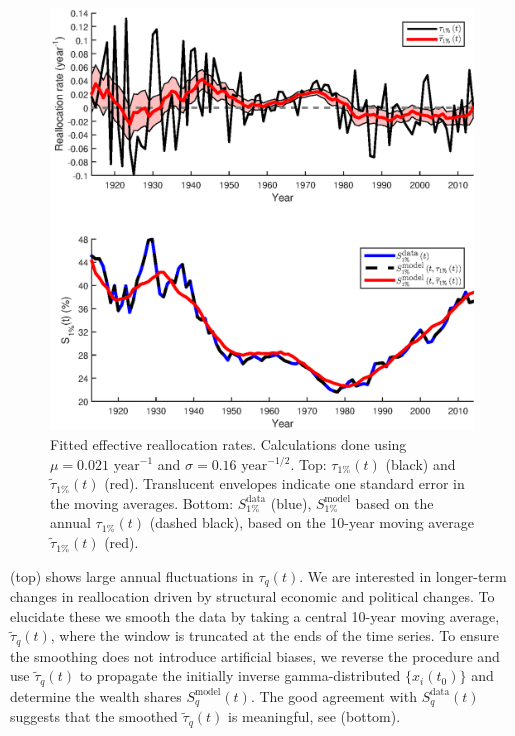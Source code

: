 \begin{figure}[!htb]
\centering
\includegraphics[width=1.0\textwidth] {./chapter_3/figs/tau_top1.eps}
\caption{Fitted effective reallocation rates. Calculations done using $\mu=0.021 \text{ year}^{-1}$ and $\sigma=0.16 \text{ year}^{-1/2}$. Top: $\tau_{1\%}\left(t\right)$ (black) and $\widetilde{\tau}_{1\%}\left(t\right)$ (red). Translucent envelopes indicate one standard error in the moving averages. Bottom: $S^{\text{data}}_{1\%}$ (blue), $S^{\text{model}}_{1\%}$ based on the annual $\tau_{1\%}\left(t\right)$ (dashed black), based on the 10-year moving average $\widetilde{\tau}_{1\%}\left(t\right)$ (red).}
\end{figure}

 (top) shows large annual fluctuations in $\tau_q\left(t\right)$. We are interested in longer-term changes in reallocation driven by structural economic and political changes. To elucidate these we smooth the data by taking a central 10-year moving average, $\widetilde{\tau}_q\left(t\right)$, where the window is truncated at the ends of the time series. To ensure the smoothing does not introduce artificial biases, we reverse the procedure and use $\widetilde{\tau}_q\left(t\right)$ to propagate the initially inverse gamma-distributed $\{x_i\left(t_0\right)\}$ and determine the wealth shares $S^{\text{model}}_q\left(t\right)$. The good agreement with $S^{\text{data}}_q\left(t\right)$ suggests that the smoothed $\widetilde{\tau}_q\left(t\right)$ is meaningful, see  (bottom).

